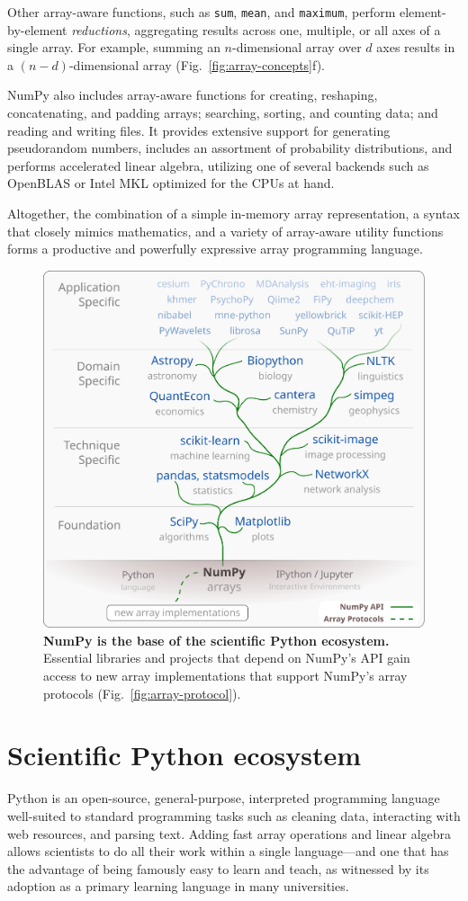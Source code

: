 Other array-aware functions, such as \texttt{sum}, \texttt{mean}, and \texttt{maximum}, perform
element-by-element \emph{reductions}, aggregating results across one,
multiple, or all axes of a single array.
For example, summing an $n$-dimensional array over $d$ axes results in a
$(n-d)$-dimensional array (Fig.~\ref{fig:array-concepts}f).

NumPy also includes array-aware functions for creating, reshaping, concatenating, and padding
arrays; searching, sorting, and counting data; and reading and writing files.
It provides extensive support for generating pseudorandom numbers,
includes an assortment of probability distributions, and
performs accelerated linear algebra, utilizing one of several backends
such as OpenBLAS \cite{wang2013augem,xianyi2012model} or Intel MKL optimized
for the CPUs at hand.

Altogether, the combination of a simple in-memory array
representation, a syntax that closely mimics mathematics, and a
variety of array-aware utility functions forms a productive and
powerfully expressive array programming language.

\begin{figure}
  \centering
  \includegraphics[width=.5\textwidth]{static/sketches/ecosystem}
  \caption{\textbf{NumPy is the base of the scientific Python ecosystem.}
   Essential libraries and projects that depend on NumPy's API gain access to new array
   implementations that support NumPy's array protocols (Fig.~\ref{fig:array-protocol}).
  }
  \label{fig:ecosystem}
\end{figure}

\section*{Scientific Python ecosystem}

Python is an open-source, general-purpose, interpreted programming language
well-suited to standard programming tasks such as cleaning data,
interacting with web resources, and parsing text.
Adding fast array operations and linear algebra allows scientists to do all
their work within a single language---and one that has the advantage of
being famously easy to learn and teach, as witnessed by its adoption
as a primary learning language in many universities.

